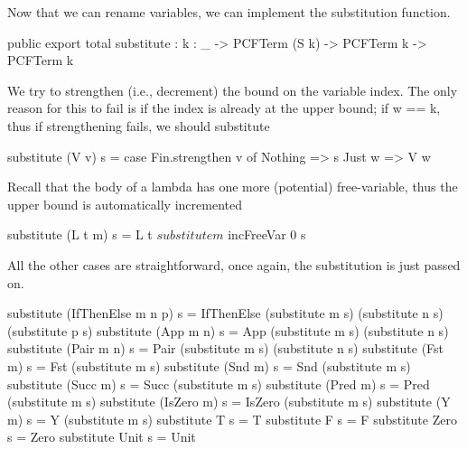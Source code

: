 Now that we can rename variables, we can implement the substitution function.

\begin{code}
public export
total substitute : {k : _} -> PCFTerm (S k) -> PCFTerm k -> PCFTerm k
\end{code}

We try to strengthen (i.e., decrement) the bound on the variable index.
The only reason for this to fail is if the index is already at the upper bound; if w == k, thus
if strengthening fails, we should substitute

\begin{code}
substitute (V v) s = case Fin.strengthen v of
                     Nothing => s
                     Just w  => V w
\end{code}

Recall that the body of a lambda has one more (potential) free-variable, thus the upper bound is
automatically incremented

\begin{code}
substitute (L t m) s = L t $ substitute m $ incFreeVar 0 s
\end{code}

All the other cases are straightforward, once again, the substitution is just passed on.

\begin{hidden}
substitute (IfThenElse m n p) s = IfThenElse (substitute m s) (substitute n s) (substitute p s)
substitute (App m n)          s = App (substitute m s) (substitute n s)
substitute (Pair m n)         s = Pair (substitute m s) (substitute n s)
substitute (Fst m)            s = Fst (substitute m s)
substitute (Snd m)            s = Snd (substitute m s)
substitute (Succ m)           s = Succ (substitute m s)
substitute (Pred m)           s = Pred (substitute m s)
substitute (IsZero m)         s = IsZero (substitute m s)
substitute (Y m)              s = Y (substitute m s)
substitute T                  s = T
substitute F                  s = F
substitute Zero               s = Zero
substitute Unit               s = Unit
\end{hidden}
